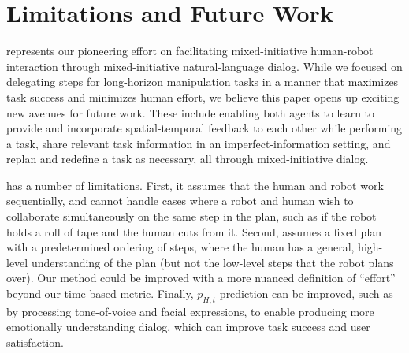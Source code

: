 \section{Limitations and Future Work}
\label{sec:limitations-future-work}
\ours{} represents our pioneering effort on facilitating mixed-initiative human-robot interaction through mixed-initiative natural-language dialog. While we focused on delegating steps for long-horizon manipulation tasks in a manner that maximizes task success and minimizes human effort, we believe this paper opens up exciting new avenues for future work. These include enabling both agents to learn to provide and incorporate spatial-temporal feedback to each other while performing a task, share relevant task information in an imperfect-information setting, and replan and redefine a task as necessary, all through mixed-initiative dialog.

\ours{} has a number of limitations.
First, it assumes that the human and robot work sequentially, and cannot handle cases where a robot and human wish to collaborate simultaneously on the same step in the plan, such as if the robot holds a roll of tape and the human cuts from it. 
Second, \ours{} assumes a fixed plan with a predetermined ordering of steps, where the human has a general, high-level understanding of the plan (but not the low-level steps that the robot plans over).
Our method could be improved with a more nuanced definition of ``effort'' beyond our time-based metric.
Finally, $p_{H, t}$ prediction can be improved, such as by processing tone-of-voice and facial expressions, to enable producing more emotionally understanding dialog, which can improve task success and user satisfaction.